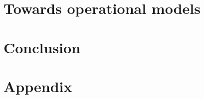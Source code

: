 









\cleardoublepage %



\ctparttext{} %


\part{Towards operational models} %









\ctparttext{}


\part*{Conclusion}





% 

\cleardoublepage %



\part{Appendix} %





